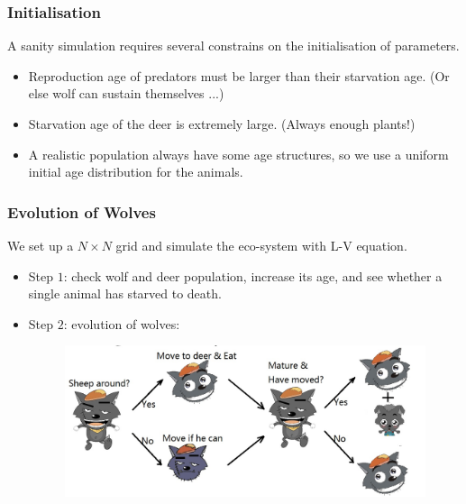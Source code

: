 \documentclass{beamer}
\begin{document}
\frame
{
  	\frametitle{Initialisation}
  	A sanity simulation requires several constrains on the initialisation of parameters.
  	\begin{itemize}
  	\item<1->{Reproduction age of predators must be larger than their starvation age. (Or else wolf can sustain themselves ...)}
  	\item<2->{Starvation age of the deer is extremely large. (Always enough plants!)}
	\item<3->{A realistic population always have some age structures, so we use a uniform initial age distribution for the animals.}
  	\end{itemize} 
}

\frame
{
  	\frametitle{Evolution of Wolves}
 	 We set up a $N \times N$ grid and simulate the eco-system with L-V equation. \\
  	 \begin{itemize}
  	\item<1->{Step $1$: check wolf and deer population, increase its age, and see whether a single animal has starved to death.}
  	\item<2->{Step $2$: evolution of wolves:
  
 	 \begin{figure}[htb]
  	\begin{center}
 	 \includegraphics[width=\textwidth]{./pics/wolf.jpeg}
 	 \label{default}
  	\end{center}
  	\end{figure}
 	 }
 	 \end{itemize}
}
\end{document}
